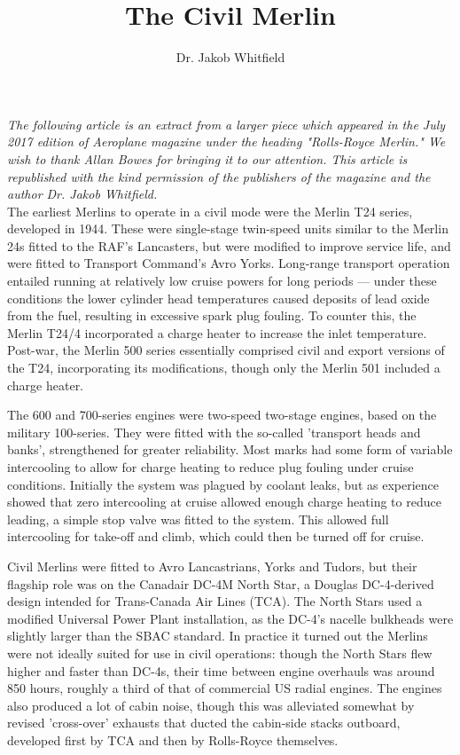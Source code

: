 %


\title{The Civil Merlin} 
\author{Dr. Jakob Whitfield}
\maketitle

\textit{The following article is an extract from a larger piece which appeared
in the July 2017 edition of Aeroplane magazine under the heading
"Rolls-Royce Merlin."  We wish to thank Allan Bowes for bringing it to
our attention. This article is republished with the kind permission of
the publishers of the magazine and the author Dr. Jakob Whitfield.}\\


The earliest Merlins to operate in a civil mode were the Merlin T24
series, developed in 1944. These were single-stage twin-speed units
similar to the Merlin 24s fitted to the RAF's Lancasters, but were
modified to improve service life, and were fitted to Transport
Command's Avro Yorks. Long-range transport operation entailed running
at relatively low cruise powers for long periods — under these
conditions the lower cylinder head temperatures caused deposits of lead
oxide from the fuel, resulting in excessive spark plug fouling. To
counter this, the Merlin T24/4 incorporated a charge heater to increase
the inlet temperature. Post-war, the Merlin 500 series essentially
comprised civil and export versions of the T24, incorporating its
modifications, though only the Merlin 501 included a charge heater.

The 600 and 700-series engines were two-speed two-stage engines, based
on the military 100-series. They were fitted with the so-called
'transport heads and banks', strengthened for greater reliability. Most
marks had some form of variable intercooling to allow for charge
heating to reduce plug fouling under cruise conditions. Initially the
system was plagued by coolant leaks, but as experience showed that zero
intercooling at cruise allowed enough charge heating to reduce leading,
a simple stop valve was fitted to the system. This allowed full
intercooling for take-off and climb, which could then be turned off for
cruise.

Civil Merlins were fitted to Avro Lancastrians, Yorks and Tudors, but
their flagship role was on the Canadair DC-4M North Star, a Douglas
DC-4-derived design intended for Trans-Canada Air Lines (TCA). The
North Stars used a modified Universal Power Plant installation, as the
DC-4's nacelle bulkheads were slightly larger than the SBAC standard.
In practice it turned out the Merlins were not ideally suited for use
in civil operations: though the North Stars flew higher and faster than
DC-4s, their time between engine overhauls was around 850 hours,
roughly a third of that of commercial US radial engines. The engines
also produced a lot of cabin noise, though this was alleviated somewhat
by revised 'cross-over' exhausts that ducted the cabin-side stacks
outboard, developed first by TCA and then by Rolls-Royce themselves.


